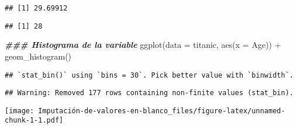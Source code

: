 \documentclass[
]{article}
\newenvironment{Shaded}{\begin{snugshade}}{\end{snugshade}}
\newcommand{\AttributeTok}[1]{\textcolor[rgb]{0.77,0.63,0.00}{#1}}
\newcommand{\ConstantTok}[1]{\textcolor[rgb]{0.00,0.00,0.00}{#1}}
\newcommand{\DocumentationTok}[1]{\textcolor[rgb]{0.56,0.35,0.01}{\textbf{\textit{#1}}}}
\newcommand{\FunctionTok}[1]{\textcolor[rgb]{0.00,0.00,0.00}{#1}}
\newcommand{\NormalTok}[1]{#1}
\newcommand{\OtherTok}[1]{\textcolor[rgb]{0.56,0.35,0.01}{#1}}
\newcommand{\SpecialCharTok}[1]{\textcolor[rgb]{0.00,0.00,0.00}{#1}}
\begin{document}
\begin{Shaded}
\end{Shaded}

\begin{verbatim}
## [1] 29.69912
\end{verbatim}

\begin{Shaded}
\end{Shaded}

\begin{verbatim}
## [1] 28
\end{verbatim}

\begin{Shaded}
\begin{Highlighting}[]
\DocumentationTok{\#\#\# Histograma de la variable}
\FunctionTok{ggplot}\NormalTok{(}\AttributeTok{data =}\NormalTok{ titanic, }\FunctionTok{aes}\NormalTok{(}\AttributeTok{x =}\NormalTok{ Age)) }\SpecialCharTok{+} \FunctionTok{geom\_histogram}\NormalTok{()}
\end{Highlighting}
\end{Shaded}

\begin{verbatim}
## `stat_bin()` using `bins = 30`. Pick better value with `binwidth`.
\end{verbatim}

\begin{verbatim}
## Warning: Removed 177 rows containing non-finite values (stat_bin).
\end{verbatim}

\texttt{[image: Imputación-de-valores-en-blanco\_files/figure-latex/unnamed-chunk-1-1.pdf]}

\begin{Shaded}
\end{Shaded}
\end{document}
